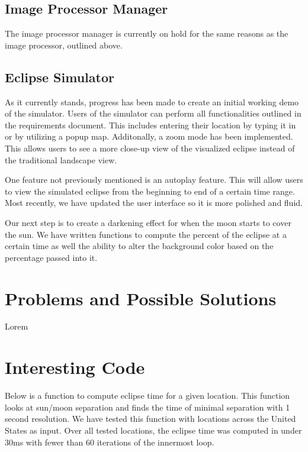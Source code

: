 \documentclass[10pt, onecolumn, draftclsnofoot, letterpaper, compsoc]{IEEEtran}
\begin{document}
\subsection{Image Processor Manager}

The image processor manager is currently on hold for the same reasons as the image processor,
outlined above.

\subsection{Eclipse Simulator}

As it currently stands, progress has been made to create an initial working
demo of the simulator. Users of the simulator can perform all functionalities
outlined in the requirements document. This includes entering their location by
typing it in or by utilizing a popup map. Additonally, a zoom mode has been
implemented. This allows users to see a more close-up view of the visualized
eclipse instead of the traditional landscape view.

One feature not previously mentioned is an autoplay feature. This will allow
users to view the simulated eclipse from the beginning to end of a certain
time range. Most recently, we have updated the user interface so it is more
polished and fluid.

Our next step is to create a darkening effect for when the moon starts to
cover the sun. We have written functions to compute the percent of the eclipse
at a certain time as well the ability to alter the background color based on
the percentage passed into it.

\section{Problems and Possible Solutions}

Lorem

\section{Interesting Code}

Below is a function to compute eclipse time for a given location. This function looks at sun/moon
separation and finds the time of minimal separation with 1 second resolution. We have tested
this function with locations across the United States as input. Over all tested locations, the
eclipse time was computed in under 30ms with fewer than 60 iterations of the innermost loop. \\
\end{document}
